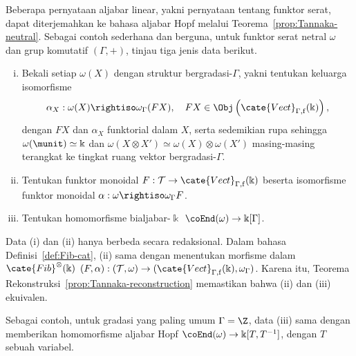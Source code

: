 \begin{remark}
	Beberapa pernyataan aljabar linear, yakni pernyataan tentang funktor
	serat, dapat diterjemahkan ke bahasa aljabar Hopf melalui
	Teorema~\ref{prop:Tannaka-neutral}. Sebagai contoh sederhana dan berguna,
	untuk funktor serat netral $\omega$ dan grup komutatif $(\Gamma,+)$,
	tinjau tiga jenis data berikut.
	\begin{enumerate}[(i)]
		\item Bekali setiap $\omega(X)$ dengan struktur bergradasi-$\Gamma$,
		yakni tentukan keluarga isomorfisme
		\[ \alpha_X: \omega(X) \rightiso \omega_\Gamma(FX), \quad FX \in \Obj\left( \cate{Vect}_{\Gamma, \mathrm{f}}(\Bbbk) \right), \]
		dengan $FX$ dan $\alpha_X$ funktorial dalam $X$, serta sedemikian rupa
		sehingga $\omega(\munit)\simeq\Bbbk$ dan
		$\omega(X\otimes X')\simeq\omega(X)\otimes\omega(X')$ masing-masing
		terangkat ke tingkat ruang vektor bergradasi-$\Gamma$.
		\item Tentukan funktor monoidal
		$F:\mathcal{T}\to\cate{Vect}_{\Gamma,\mathrm f}(\Bbbk)$ beserta
		isomorfisme funktor monoidal
		$\alpha:\omega\rightiso\omega_\Gamma F$.
		\item Tentukan homomorfisme bialjabar-$\Bbbk$
		$\coEnd(\omega)\to\Bbbk[\Gamma]$.
	\end{enumerate}

	Data (i) dan (ii) hanya berbeda secara redaksional. Dalam bahasa
	Definisi~\ref{def:Fib-cat}, (ii) sama dengan menentukan morfisme dalam
	$\cate{Fib}^{\otimes}(\Bbbk)$
	$(F,\alpha):(\mathcal{T},\omega)\to
	(\cate{Vect}_{\Gamma,\mathrm f}(\Bbbk),\omega_\Gamma)$. Karena itu,
	Teorema Rekonstruksi~\ref{prop:Tannaka-reconstruction} memastikan bahwa
	(ii) dan (iii) ekuivalen.

	Sebagai contoh, untuk gradasi yang paling umum $\Gamma=\Z$, data (iii)
	sama dengan memberikan homomorfisme aljabar Hopf
	$\coEnd(\omega)\to\Bbbk[T,T^{-1}]$, dengan $T$ sebuah variabel.
\end{remark}
